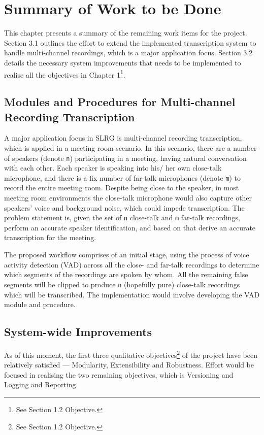 \chapter{Summary of Work to be Done}

This chapter presents a summary of the remaining work items for the project.
Section 3.1 outlines the effort to extend the implemented transcription system
to handle multi-channel recordings, which is a major application focus. Section
3.2 details the necessary system improvements that needs to be implemented to
realise all the objectives in Chapter 1\footnote{See Section 1.2 Objective.}.

\section{Modules and Procedures for Multi-channel Recording Transcription}

A major application focus in SLRG is multi-channel recording transcription,
which is applied in a meeting room scenario. In this scenario, there are a number
of speakers (denote \texttt{n}) participating in a meeting, having natural
conversation with each other. Each speaker is speaking into his/ her own
close-talk microphone, and there is a fix number of far-talk microphones
(denote \texttt{m}) to record the entire meeting room. Despite being close
to the speaker, in most meeting room environments the close-talk microphone
would also capture other speakers' voice and background noise, which could
impede transcription. The problem statement is, given the set of \texttt{n}
close-talk and \texttt{m} far-talk recordings, perform an accurate speaker
identification, and based on that derive an accurate transcription for the
meeting.

The proposed workflow comprises of an initial stage, using the process of
voice activity detection (VAD) across all the close- and far-talk recordings
to determine which segments of the recordings are spoken by whom. All the
remaining false segments will be clipped to produce \texttt{n} (hopefully pure)
close-talk recordings which will be transcribed. The implementation would
involve developing the VAD module and procedure.

\section{System-wide Improvements}

As of this moment, the first three qualitative objectives\footnote{See Section
1.2 Objective.} of the project have
been relatively satisfied --- Modularity, Extensibility and Robustness. Effort
would be focused in realising the two remaining objectives, which is Versioning
and Logging and Reporting.


